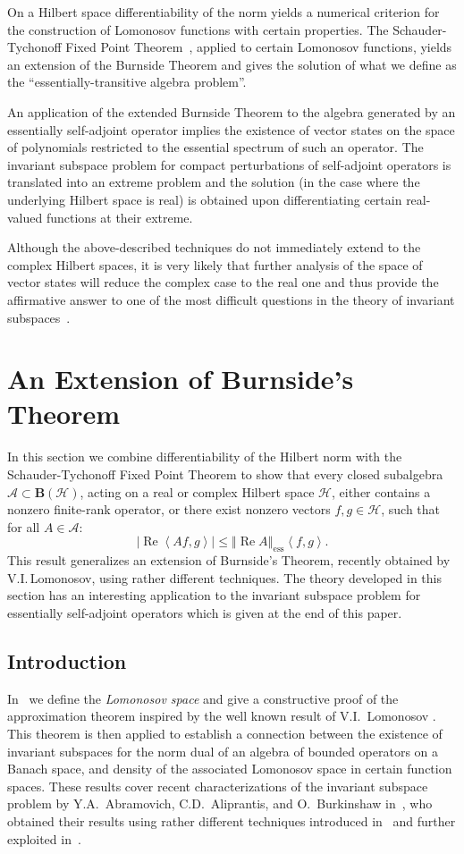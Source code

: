 \documentclass{tran-l}
\theoremstyle{definition}
\theoremstyle{remark}
\numberwithin{equation}{subsection}
\DeclareMathOperator{\RE}{Re}
\DeclareMathOperator{\ess}{ess}
\newcommand{\h}{\mathcal{H}}
\newcommand{\A}{\mathcal{A}}
\newcommand{\BH}{\mathbf{B}(\mathcal{H})}
\newcommand{\abs}[1]{\left\vert#1\right\vert}
\newcommand{\seq}[1]{\left<#1\right>}
\newcommand{\norm}[1]{\left\Vert#1\right\Vert}
\newcommand{\essnorm}[1]{\norm{#1}_{\ess}}
\begin{document}
On a Hilbert space differentiability of the norm yields a numerical criterion for the construction of Lomonosov functions with certain properties. The Schauder-Tychonoff Fixed Point Theorem~\cite[p.~456]{DS57}, applied to certain Lomonosov functions, yields an extension of the Burnside Theorem and gives the solution of what we define as the ``essentially-transitive algebra problem''.

An application of the extended Burnside Theorem to the algebra generated by an essentially self-adjoint operator implies the existence of vector states on the space of polynomials restricted to the essential spectrum of such an operator. The invariant subspace problem for compact perturbations of self-adjoint operators is translated into an extreme problem and the solution (in the case where the underlying Hilbert space is real) is obtained upon differentiating certain real-valued functions at their extreme.

Although the above-described techniques do not immediately extend to the complex Hilbert spaces, it is very likely that further analysis of the space of vector states will reduce the complex case to the real one and thus provide the affirmative answer to one of the most difficult questions in the theory of invariant subspaces~\cite{Lom92}.

\section{An Extension of Burnside's Theorem}

In this section we combine differentiability of the Hilbert norm with the Schauder-Tychonoff Fixed Point Theorem to show that every closed subalgebra $\A \subset \BH$, acting on a real or complex Hilbert space $\h$, either contains a nonzero finite-rank operator, or there exist nonzero vectors $f,g \in \h$, such that for all $A \in \A$:
\[ \abs{\RE\seq{A f,g}}\leq\essnorm{\RE A}\seq{f,g}. \]
This result generalizes an extension of Burnside's Theorem, recently obtained by V.I.\,Lomonosov, using rather different techniques. The theory developed in this section has an interesting application to the invariant subspace problem for essentially self-adjoint operators which is given at the end of this paper.

\subsection{Introduction}
In~\cite{Sim96a} we define the \emph{Lomonosov space} and give a constructive proof of the approximation theorem inspired by the well known result of V.I.~Lo\-mo\-no\-sov \cite{Lom73}. This theorem is then applied to establish a connection between the existence of invariant subspaces for the norm dual of an algebra of bounded operators on a Banach space, and density of the associated Lomonosov space in certain function spaces. These results cover recent characterizations of the invariant subspace problem by Y.A.~Abramovich, C.D.~Aliprantis, and O.~Burkinshaw in~\cite{AAB95}, who obtained their results using rather different techniques introduced in~\cite{Lom91} and further exploited in~\cite{dB93}.
\end{document}
